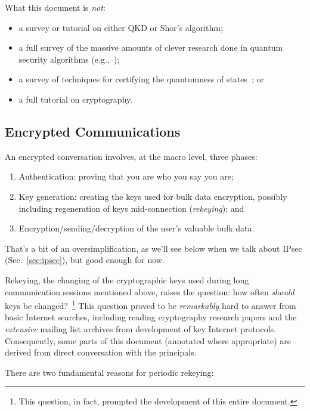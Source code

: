 \documentclass[%
 aip,
 jmp,%
 amsmath,amssymb,
 reprint,%
]{revtex4-1}
\begin{document}
What this document is \emph{not}:

\begin{itemize}
\item a survey or tutorial on either QKD or Shor's algorithm;
\item a full survey of the massive amounts of clever research done in
  quantum security algorithms
  (e.g.,~\cite{PhysRevA.100.052326,buhrman14:_posit_based_quant_crypt,ben-or2005fast,crepeau:_secur_multi_party_qc});
\item a survey of techniques for certifying the quantumness of states~\cite{eisert2019cert}; or
\item a full tutorial on cryptography.
\end{itemize}

\subsection{Encrypted Communications}

An encrypted conversation involves, at the macro level, three phases:

\begin{enumerate}
\item Authentication: proving that you are who you say you are;
\item Key generation: creating the keys used for bulk data encryption,
  possibly including regeneration of keys mid-connection
  (\emph{rekeying}); and
\item Encryption/sending/decryption of the user's valuable bulk data.
\end{enumerate}

That's a bit of an oversimplification, as we'll see below when we talk
about IPsec (Sec.~\ref{sec:ipsec}), but good enough for now.

Rekeying, the changing of the cryptographic keys used during long
communication sessions mentioned above, raises the question: how often
\emph{should} keys be changed?~\footnote{This question, in fact,
  prompted the development of this entire document.}  This question
proved to be \emph{remarkably} hard to answer from basic Internet
searches, including reading cryptography research papers and the
\emph{extensive} mailing list archives from development of key
Internet protocols.  Consequently, some parts of this document
(annotated where appropriate) are derived from direct conversation
with the principals.

There are two fundamental reasons for periodic rekeying:
\end{document}
